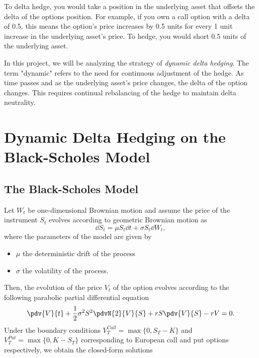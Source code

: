 \documentclass{article}
\begin{document}
To delta hedge, you would take a position in the underlying asset that offsets the delta of the options position. For example, if you own a call option with a delta of 0.5, this means the option's price increases by 0.5 units for every 1 unit increase in the underlying asset's price. To hedge, you would short 0.5 units of the underlying asset.

In this project, we will be analyzing the strategy of \textit{dynamic delta hedging}. The term "dynamic" refers to the need for continuous adjustment of the hedge. As time passes and as the underlying asset's price changes, the delta of the option changes. This requires continual rebalancing of the hedge to maintain delta neutrality.


\section{Dynamic Delta Hedging on the Black-Scholes Model}

\subsection{The Black-Scholes Model}

Let $ W_{t} $ be one-dimensional Brownian motion and assume the price of the instrument $ S_{t} $ evolves according to geometric Brownian motion as 
\begin{equation*}
	\dd{S_{t}} = \mu S_{t} \dd{t} + \sigma S_{t} \dd{W_{t}},
\end{equation*}
where the parameters of the model are given by 
\begin{itemize}
	\item $ \mu $ the deterministic drift of the process
	\item $ \sigma $ the volatility of the process.
\end{itemize}

Then, the evolution of the price $ V_{t} $ of the option evolves according to the following parabolic partial differential equation
\[
	\pdv{V}{t} + \frac{1}{2}\sigma^{2}S^{2} \pdvN{2}{V}{S} + rS \pdv{V}{S} -rV = 0.
\]
Under the boundary conditions $ V_{T}^{Call} = \max\{0, S_{T}-K\} $ and $ V_{T}^{Put} = \max\{0, K-S_{T}\} $ corresponding to European call and put options respectively, we obtain the closed-form solutions
\end{document}
